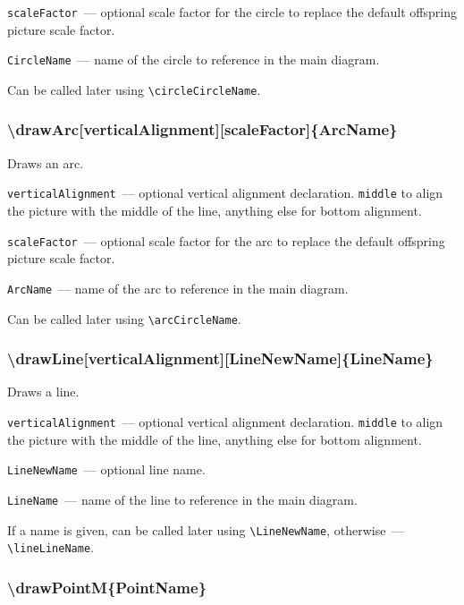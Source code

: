 	\texttt{scaleFactor}~— optional scale factor for the circle to replace the default offspring picture scale factor. 
	
	\texttt{CircleName}~— name of the circle to reference in the main diagram. 
	
	Can be called later using \texttt{\textbackslash circleCircleName}.
	
\subsubsection{\textbackslash drawArc[verticalAlignment][scaleFactor]\{ArcName\}}

	Draws an arc.

	\texttt{verticalAlignment}~— optional vertical alignment declaration. \texttt{middle} to align the picture with the middle of the line, anything else for bottom alignment.
	
	\texttt{scaleFactor}~— optional scale factor for the arc to replace the default offspring picture scale factor. 
	
	\texttt{ArcName}~— name of the arc to reference in the main diagram. 
	
	Can be called later using \texttt{\textbackslash arcCircleName}.
	
\subsubsection{\textbackslash drawLine[verticalAlignment][LineNewName]\{LineName\}}

	Draws a line.

	\texttt{verticalAlignment}~— optional vertical alignment declaration. \texttt{middle} to align the picture with the middle of the line, anything else for bottom alignment.
	
	\texttt{LineNewName}~— optional line name. 
	
	\texttt{LineName}~— name of the line to reference in the main diagram. 
	
	If a name is given, can be called later using \texttt{\textbackslash LineNewName}, otherwise~— \texttt{\textbackslash lineLineName}. 
	
\subsubsection{\textbackslash drawPointM\{PointName\}}


